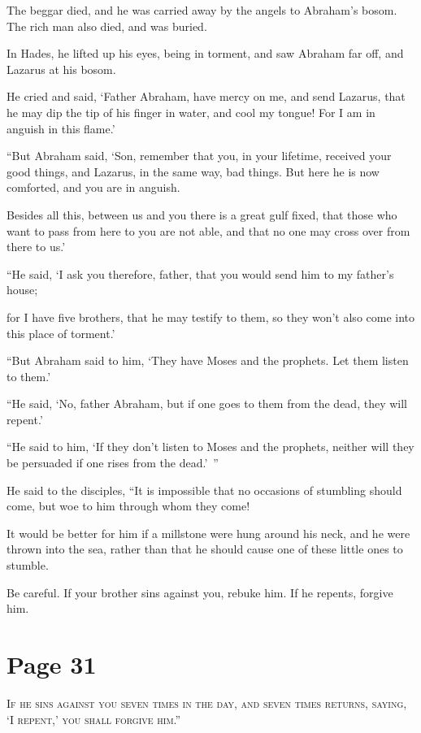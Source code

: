 The beggar died, and he was carried away by the angels to Abraham’s bosom. The rich man also died, and was buried.

In Hades, he lifted up his eyes, being in torment, and saw Abraham far off, and Lazarus at his bosom.

He cried and said, ‘Father Abraham, have mercy on me, and send Lazarus, that he may dip the tip of his finger in water, and cool my tongue! For I am in anguish in this flame.’

“But Abraham said, ‘Son, remember that you, in your lifetime, received your good things, and Lazarus, in the same way, bad things. But here he is now comforted, and you are in anguish.

Besides all this, between us and you there is a great gulf fixed, that those who want to pass from here to you are not able, and that no one may cross over from there to us.’

“He said, ‘I ask you therefore, father, that you would send him to my father’s house;

for I have five brothers, that he may testify to them, so they won’t also come into this place of torment.’

“But Abraham said to him, ‘They have Moses and the prophets. Let them listen to them.’

“He said, ‘No, father Abraham, but if one goes to them from the dead, they will repent.’

“He said to him, ‘If they don’t listen to Moses and the prophets, neither will they be persuaded if one rises from the dead.’ ”

He said to the disciples, “It is impossible that no occasions of stumbling should come, but woe to him through whom they come!

It would be better for him if a millstone were hung around his neck, and he were thrown into the sea, rather than that he should cause one of these little ones to stumble.

Be careful. If your brother sins against you, rebuke him. If he repents, forgive him.



\chapterornament
\section*{Page 31}

\lettrine{I}{f he sins against you seven times in the day, and seven times returns, saying, ‘I repent,’ you shall forgive him.”}

